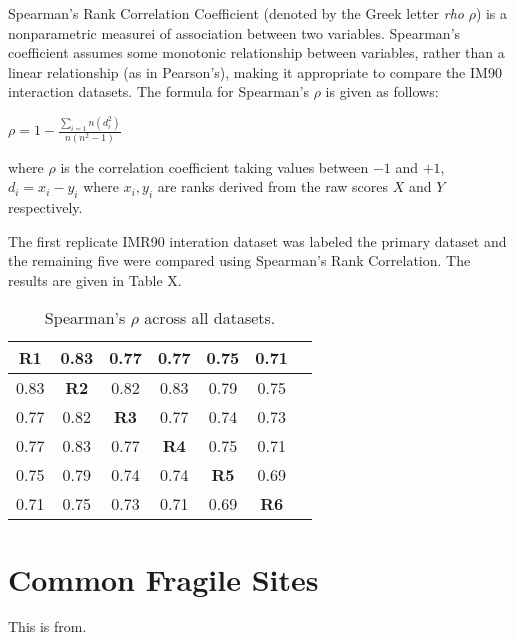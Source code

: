 \documentclass[phd,tocprelim]{cornell}
\begin{document}
Spearman's Rank Correlation Coefficient (denoted by the Greek letter \textit{rho}
$\rho$) is a nonparametric measurei of association between two variables.
Spearman's coefficient assumes some monotonic relationship between variables,
rather than a linear relationship (as in Pearson's), making it appropriate
to compare the IM90 interaction datasets.  The formula for Spearman's $\rho$ is
given as follows:

$
\rho = 1 - \frac{\sum_{i=1}{n}(d_i^2)}{n(n^2 - 1)}
$

where $\rho$ is the correlation coefficient taking values between $-1$ and $+1$,
$d_i = x_i - y_i$ where $x_i, y_i$ are ranks derived from the raw scores $X$ and
$Y$ respectively.

The first replicate IMR90 interation dataset was labeled the primary dataset
and the remaining five were compared using Spearman's Rank Correlation.  The
results are given in Table X.

\begin{table}
  \begin{tabular}{|c|*{6}{c|}}
    \textbf{R1} & 0.83 & 0.77 & 0.77 & 0.75 & 0.71 \\ \hline
    0.83 & \textbf{R2} & 0.82 & 0.83 & 0.79 & 0.75 \\ \hline
    0.77 & 0.82 & \textbf{R3} & 0.77 & 0.74 & 0.73 \\ \hline
    0.77 & 0.83 & 0.77 & \textbf{R4} & 0.75 & 0.71 \\ \hline
    0.75 & 0.79 & 0.74 & 0.74 & \textbf{R5} & 0.69 \\ \hline
    0.71 & 0.75 & 0.73 & 0.71 & 0.69 & \textbf{R6} \\
  \end{tabular}
  \caption{Spearman's $\rho$ across all datasets.}
  \label{tab:correlations}
\end{table}

\chapter{Common Fragile Sites}
This is from\cite{fragsites2001}.
\end{document}
